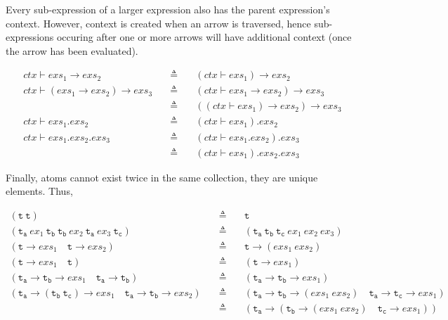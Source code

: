 \documentclass[a4paper,11pt]{article}
\begin{document}
{\color{gray}
Every sub-expression of a larger expression also has the parent expression's context.
However, context is created when an arrow is traversed, hence sub-expressions occuring after one or more arrows will have additional context (once the arrow has been evaluated).

\begin{eqnarray*}
ctx \vdash exs_1 \rightarrow exs_2 \quad&\triangleq&\quad (ctx \vdash exs_1) \rightarrow exs_2 \\
ctx \vdash (exs_1 \rightarrow exs_2) \rightarrow exs_3 \quad&\triangleq&\quad (ctx \vdash exs_1 \rightarrow exs_2) \rightarrow exs_3 \\
                                                            &\triangleq&\quad ((ctx \vdash exs_1) \rightarrow exs_2) \rightarrow exs_3 \\
ctx \vdash exs_1.exs_2 \quad&\triangleq&\quad (ctx \vdash exs_1).exs_2 \\
ctx \vdash exs_1.exs_2.exs_3 \quad&\triangleq&\quad (ctx \vdash exs_1.exs_2).exs_3 \\
                                  &\triangleq&\quad (ctx \vdash exs_1).exs_2.exs_3
\end{eqnarray*}

Finally, atoms cannot exist twice in the same collection, they are unique elements. Thus,

\begin{eqnarray*}
(\mathtt{t}\ \mathtt{t}) \quad&\triangleq&\quad \mathtt{t} \\
(\mathtt{t_a}\ ex_1\ \mathtt{t_b}\ \mathtt{t_b}\ ex_2\ \mathtt{t_a}\ ex_3\ \mathtt{t_c}) \quad&\triangleq&\quad (\mathtt{t_a}\ \mathtt{t_b}\ \mathtt{t_c}\ ex_1\ ex_2\ ex_3) \\
(\mathtt{t} \rightarrow exs_1 \quad \mathtt{t} \rightarrow exs_2) \quad&\triangleq&\quad \mathtt{t} \rightarrow (exs_1\ exs_2) \\
(\mathtt{t} \rightarrow exs_1 \quad \mathtt{t}) \quad&\triangleq&\quad (\mathtt{t} \rightarrow exs_1) \\
(\mathtt{t_a} \rightarrow \mathtt{t_b} \rightarrow exs_1 \quad \mathtt{t_a} \rightarrow \mathtt{t_b}) \quad&\triangleq&\quad (\mathtt{t_a} \rightarrow \mathtt{t_b} \rightarrow exs_1) \\
(\mathtt{t_a} \rightarrow (\mathtt{t_b}\ \mathtt{t_c}) \rightarrow exs_1 \quad \mathtt{t_a} \rightarrow \mathtt{t_b} \rightarrow exs_2) \quad&\triangleq&\quad (\mathtt{t_a} \rightarrow \mathtt{t_b} \rightarrow (exs_1\ exs_2) \quad \mathtt{t_a} \rightarrow \mathtt{t_c} \rightarrow exs_1)\\
    \quad&\triangleq&\quad (\mathtt{t_a} \rightarrow (\mathtt{t_b} \rightarrow (exs_1\ exs_2) \quad \mathtt{t_c} \rightarrow exs_1))
\end{eqnarray*}
}
\end{document}
